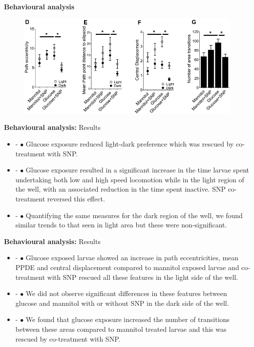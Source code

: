 \documentclass{beamer}
\newlength{\tmpShadow}
\newcommand{\MyShadow}[2]{%
	\settowidth{\tmpShadow}{#1}
	\addtolength{\tmpShadow}{.1em}
	\raisebox{-0.25ex}{\textcolor{gray!70}{#1}}%
	\kern-\tmpShadow%
	\textcolor{#2}{#1}%
}
\begin{document}
{\begin{frame}{\textbf{Behavioural analysis}}
	\begin{figure}[H]
		\centering
		\includegraphics[width=\textwidth]{figures/results3}
	\end{figure}	
\end{frame}

\begin{frame}{\textbf{Behavioural analysis:} Results}
	\begin{itemize}
		\item<1->{\MyShadow{$\bullet$}{red!80}} Glucose exposure reduced light-dark preference which was rescued by co-treatment with SNP.
		\item<2->{\MyShadow{$\bullet$}{red!80}} Glucose exposure resulted in a significant increase in the time larvae spent undertaking both low and high speed locomotion while in the light region of the well, with an associated reduction in the time spent inactive. SNP co-treatment reversed this effect.
		\item<3->{\MyShadow{$\bullet$}{blue!80}} Quantifying the same measures for the dark region of the well, we found similar trends to that seen in light area but these were non-significant.
	\end{itemize}
\end{frame}

\begin{frame}{\textbf{Behavioural analysis:} Results}
	\begin{itemize}
		\item<1->{\MyShadow{$\bullet$}{red!80}} Glucose exposed larvae showed an increase in path eccentricities, mean PPDE and central displacement compared to mannitol exposed larvae and co-treatment with SNP rescued all these features in the light side of the well.
		\item<2->{\MyShadow{$\bullet$}{blue!80}} We did not observe significant differences in these features between glucose and mannitol with or without SNP in the dark side of the well. 
		\item<3->{\MyShadow{$\bullet$}{red!80}} We found that glucose exposure increased the number of transitions between these areas compared to mannitol treated larvae and this was rescued by co-treatment with SNP.
	\end{itemize}
\end{frame}

}
\end{document}
